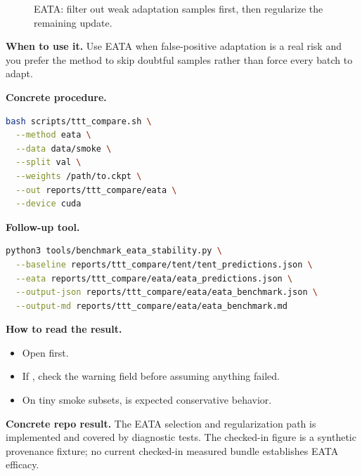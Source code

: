 \begin{figure}[h]
\centering
{}
\caption{EATA: filter out weak adaptation samples first, then regularize the remaining update.}
\end{figure}

\textbf{When to use it.}
Use EATA when false-positive adaptation is a real risk and you prefer the method to skip doubtful samples rather than force every batch to adapt.

\textbf{Concrete procedure.}
\begin{lstlisting}[language=bash]
bash scripts/ttt_compare.sh \
  --method eata \
  --data data/smoke \
  --split val \
  --weights /path/to.ckpt \
  --out reports/ttt_compare/eata \
  --device cuda
\end{lstlisting}

\textbf{Follow-up tool.}
\begin{lstlisting}[language=bash]
python3 tools/benchmark_eata_stability.py \
  --baseline reports/ttt_compare/tent/tent_predictions.json \
  --eata reports/ttt_compare/eata/eata_predictions.json \
  --output-json reports/ttt_compare/eata/eata_benchmark.json \
  --output-md reports/ttt_compare/eata/eata_benchmark.md
\end{lstlisting}

\textbf{How to read the result.}
\begin{itemize}
  \item Open  first.
  \item If \cmd{steps_run=0}, check the warning field before assuming anything failed.
  \item On tiny smoke subsets, \cmd{eata_empty_selected_set} is expected conservative behavior.
\end{itemize}

\textbf{Concrete repo result.}
The EATA selection and regularization path is implemented and covered by
diagnostic tests. The checked-in figure is a synthetic provenance fixture; no
current checked-in measured bundle establishes EATA efficacy.

